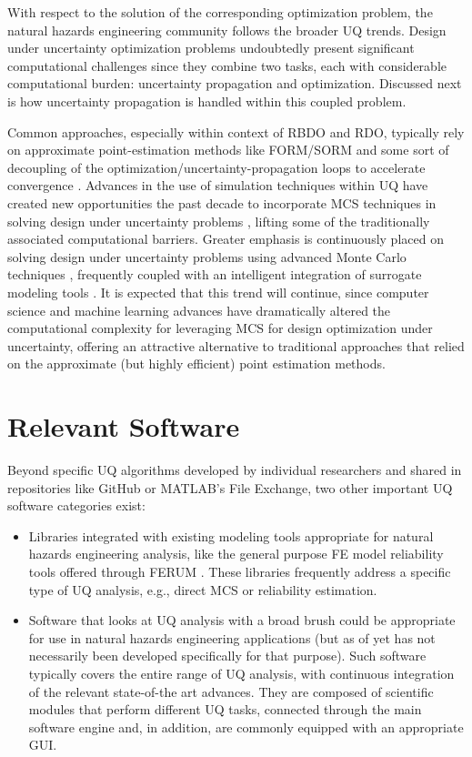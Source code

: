 With respect to the solution of the corresponding optimization problem, the natural hazards engineering community follows the broader UQ trends. Design under uncertainty optimization problems undoubtedly present significant computational challenges since they combine two tasks, each with considerable computational burden: uncertainty propagation and optimization. Discussed next is how uncertainty propagation is handled within this coupled problem.

Common approaches, especially within context of RBDO and RDO, typically rely on approximate point-estimation methods like FORM/SORM \citep{papadimitriou2018reliability} and some sort of decoupling of the optimization/uncertainty-propagation loops to accelerate convergence \citep{beyer2007robust}. Advances in the use of simulation techniques within UQ have created new opportunities the past decade to incorporate MCS techniques in solving design under uncertainty problems \citep{spall2003introduction,flint2016developing}, lifting some of the traditionally associated computational barriers. Greater emphasis is continuously placed on solving design under uncertainty problems using advanced Monte Carlo techniques \citep{medina2014adaptive}, frequently coupled with an intelligent integration of surrogate modeling tools \citep{dubourg2011reliabilitybased,bichon2013efficient,zhang2018adaptive}. It is expected that this trend will continue, since computer science and machine learning advances have dramatically altered the computational complexity for leveraging MCS for design optimization under uncertainty, offering an attractive alternative to traditional approaches that relied on the approximate (but highly efficient) point estimation methods.   

\section{Relevant Software}
\label{sec:uq_tools}

Beyond specific UQ algorithms developed by individual researchers and shared in repositories like GitHub or MATLAB's File Exchange, two other important UQ software categories exist:

\begin{itemize}
    \item Libraries integrated with existing modeling tools appropriate for natural hazards engineering analysis, like the general purpose FE model reliability tools offered through FERUM \citep{bourinet2009review}. These libraries frequently address a specific type of UQ analysis, e.g., direct MCS or reliability estimation.
    \item Software that looks at UQ analysis with a broad brush could be appropriate for use in natural hazards engineering applications (but as of yet has not necessarily been developed specifically for that purpose). Such software typically covers the entire range of UQ analysis, with continuous integration of the relevant state-of-the art advances. They are composed of scientific modules that perform different UQ tasks, connected through the main software engine and, in addition, are commonly equipped with an appropriate GUI. 
\end{itemize}
	
